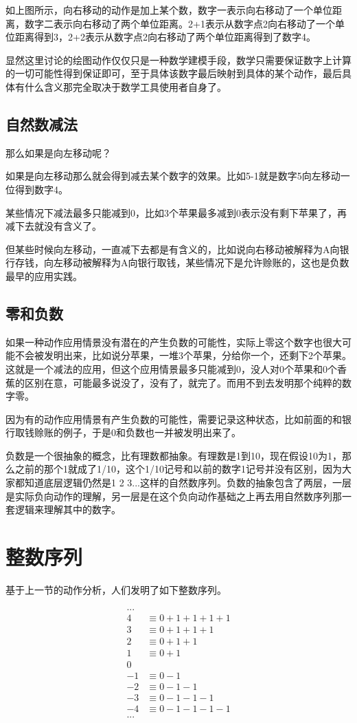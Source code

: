 \documentclass[12pt,oneside]{book}
\begin{document}
如上图所示，向右移动的动作是加上某个数，数字一表示向右移动了一个单位距离，数字二表示向右移动了两个单位距离。2+1表示从数字点2向右移动了一个单位距离得到3，2+2表示从数字点2向右移动了两个单位距离得到了数字4。

显然这里讨论的绘图动作仅仅只是一种数学建模手段，数学只需要保证数字上计算的一切可能性得到保证即可，至于具体该数字最后映射到具体的某个动作，最后具体有什么含义那完全取决于数学工具使用者自身了。

\subsection{自然数减法}
那么如果是向左移动呢？

如果是向左移动那么就会得到减去某个数字的效果。比如5-1就是数字5向左移动一位得到数字4。

某些情况下减法最多只能减到0，比如3个苹果最多减到0表示没有剩下苹果了，再减下去就没有含义了。

但某些时候向左移动，一直减下去都是有含义的，比如说向右移动被解释为A向银行存钱，向左移动被解释为A向银行取钱，某些情况下是允许赊账的，这也是负数最早的应用实践。


\subsection{零和负数}
如果一种动作应用情景没有潜在的产生负数的可能性，实际上零这个数字也很大可能不会被发明出来，比如说分苹果，一堆3个苹果，分给你一个，还剩下2个苹果。这就是一个减法的应用，但这个应用情景最多只能减到0，没人对0个苹果和0个香蕉的区别在意，可能最多说没了，没有了，就完了。而用不到去发明那个纯粹的数字零。

因为有的动作应用情景有产生负数的可能性，需要记录这种状态，比如前面的和银行取钱赊账的例子，于是0和负数也一并被发明出来了。

负数是一个很抽象的概念，比有理数都抽象。有理数是1到10，现在假设10为1，那么之前的那个1就成了1/10，这个1/10记号和以前的数字1记号并没有区别，因为大家都知道底层逻辑仍然是1 2 3...这样的自然数序列。负数的抽象包含了两层，一层是实际负向动作的理解，另一层是在这个负向动作基础之上再去用自然数序列那一套逻辑来理解其中的数字。



\section{整数序列}
基于上一节的动作分析，人们发明了如下整数序列。

\begin{align*}
...\\
4 &\equiv 0 + 1 + 1 + 1 +1 \\
3 &\equiv 0 + 1 + 1 +1 \\
2 &\equiv 0 + 1 +1 \\
1 &\equiv 0 + 1 \\
0\\
-1 &\equiv 0 - 1 \\
-2 &\equiv 0 - 1 -1\\
-3 &\equiv 0 - 1 - 1 -1 \\
-4 &\equiv 0 - 1 - 1 - 1 -1\\
...
\end{align*}
\end{document}
